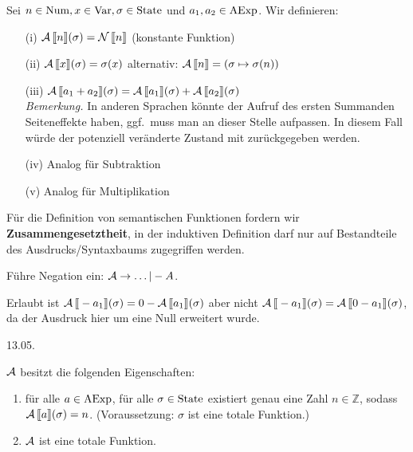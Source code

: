 \begin{definition}\label{def:Asem}
    Sei $n \in \Num, x \in \Var, \sigma \in \State$ und $a_1, a_2 \in \AExp$. Wir definieren:
    \begin{enumerate}
        \item[(i)] $\A\lsem n \rsem(\sigma) = \N\lsem n \rsem$ \quad\quad (konstante Funktion)
        \item[(ii)] $\A\lsem x \rsem(\sigma) = \sigma(x)$ \quad\quad\quad alternativ: $\A\lsem n \rsem = (\sigma \mapsto \sigma(n))$
        \item[(iii)] $\A\lsem a_1 + a_2 \rsem(\sigma) = \A\lsem a_1 \rsem(\sigma) + \A\lsem a_2 \rsem(\sigma)$ \\[4pt]
        \emph{Bemerkung.} In anderen Sprachen könnte der Aufruf des ersten Summanden Seiteneffekte haben, \dh{} ggf.\ muss man an dieser Stelle aufpassen. In diesem Fall würde der potenziell veränderte Zustand mit zurückgegeben werden.
        \item[(iv)] Analog für Subtraktion
        \item[(v)] Analog für Multiplikation
    \end{enumerate}
\end{definition}

\begin{remark}
    Für die Definition von semantischen Funktionen fordern wir \textbf{Zusammengesetztheit}, \dh{} in der induktiven Definition darf nur auf Bestandteile des Ausdrucks/Syntaxbaums zugegriffen werden.
\end{remark}

\begin{example}
    Führe Negation ein: $\A \to \dots | -A$.

    Erlaubt ist $\A\lsem -a_1 \rsem(\sigma) = 0 - \A\lsem a_1 \rsem(\sigma)$ aber nicht $\A\lsem -a_1 \rsem(\sigma) = \A\lsem 0 - a_1 \rsem(\sigma)$, da der Ausdruck hier um eine Null erweitert wurde.
\end{example}



\newpage
\hfill 13.05.

\begin{theorem}
    $\A$ besitzt die folgenden Eigenschaften:
    \begin{enumerate}
        \item für alle $a \in \AExp$, für alle $\sigma \in \State$ existiert genau eine Zahl $n \in \mathbb{Z}$, sodass $\A\lsem a \rsem (\sigma) = n$. (Voraussetzung: $\sigma$ ist eine totale Funktion.)
        \item $\A$ ist eine totale Funktion.
    \end{enumerate}
\end{theorem}

